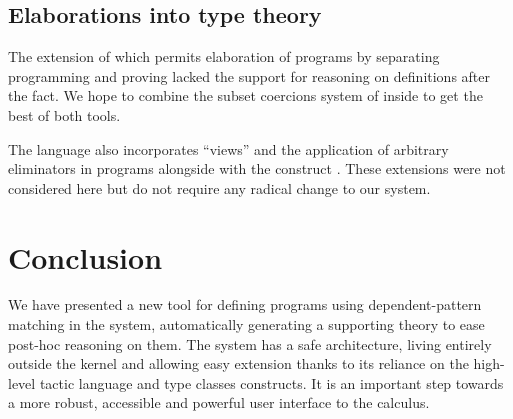 \subsection{Elaborations into type theory}
The \Program \cite{sozeau.thesis} extension of \Coq
which permits elaboration of \Coq programs by separating programming and
proving lacked the support for reasoning on definitions after the fact.
We hope to combine the subset coercions system of \Program inside 
\Equations to get the best of both tools.

The \Epigram language also incorporates ``views'' and the application of
arbitrary eliminators in programs alongside with the  construct
\cite{DBLP:journals/jfp/McBrideM04}. These extensions were not
considered here but do not require any radical change to our system.

\section{Conclusion}
\label{sec:conclusion}

We have presented a new tool for defining programs using
dependent-pattern matching in the \Coq system, automatically 
generating a supporting theory to ease post-hoc reasoning on them.
The system has a safe architecture, living entirely outside the
kernel and allowing easy extension thanks to its reliance on the
high-level tactic language and type classes constructs. It is an
important step towards a more robust, accessible and powerful user
interface to the calculus.

